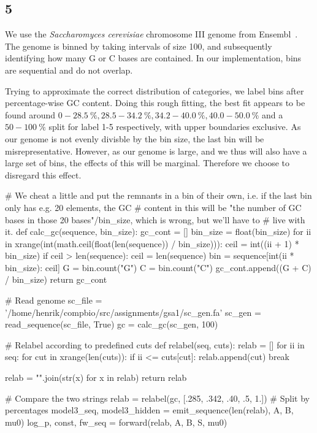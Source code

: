 \documentclass[10pt]{article}\usepackage[]{graphicx}\usepackage[]{color}
\theoremstyle{plain}
\begin{document}
\subsection*{5}
We use the \textit{Saccharomyces cerevisiae} chromosome III genome from Ensembl~\cite{sc}. The genome is binned by taking intervals of size 100, and subsequently identifying how many G or C bases are contained. In our implementation, bins are sequential and do not overlap. 

Trying to approximate the correct distribution of categories, we label bins after percentage-wise GC content. Doing this rough fitting, the best fit appears to be found around $0-28.5~\%, 28.5-34.2~\%, 34.2-40.0~\%, 40.0-50.0~\%$ and a $50-100~\%$ split for label 1-5 respectively, with upper boundaries exclusive. As our genome is not evenly divisble by the bin size, the last bin will be misrepresentative. However, as our genome is large, and we thus will also have a large set of bins, the effects of this will be marginal. Therefore we choose to disregard this effect.


\begin{Schunk}
\begin{Sinput}
# We cheat a little and put the remnants in a bin of their own, i.e. if the last bin only has e.g. 20 elements, the GC
# content in this will be "the number of GC bases in those 20 bases"/bin_size, which is wrong, but we'll have to
# live with it.
def calc_gc(sequence, bin_size):
    gc_cont = []
    bin_size = float(bin_size)
    for ii in xrange(int(math.ceil(float(len(sequence)) / bin_size))):
        ceil = int((ii + 1) * bin_size)
        if ceil > len(sequence):
            ceil = len(sequence)
        bin = sequence[int(ii * bin_size): ceil]
        G = bin.count("G")
        C = bin.count("C")
        gc_cont.append((G + C) / bin_size)
    return gc_cont


# Read genome
sc_file = '/home/henrik/compbio/src/assignments/gsa1/sc_gen.fa'
sc_gen = read_sequence(sc_file, True)
gc = calc_gc(sc_gen, 100)


# Relabel according to predefined cuts
def relabel(seq, cuts):
    relab = []
    for ii in seq:
        for cut in xrange(len(cuts)):
            if ii <= cuts[cut]:
                relab.append(cut)
                break

    relab = "".join(str(x) for x in relab)
    return relab

# Compare the two strings
relab = relabel(gc, [.285, .342, .40, .5, 1.])  # Split by percentages
model3_seq, model3_hidden = emit_sequence(len(relab), A, B, mu0)
log_p, const, fw_seq = forward(relab, A, B, S, mu0)
\end{Sinput}
\end{Schunk}
\end{document}
